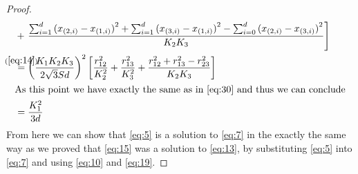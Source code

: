 \begin{proof}
\begin{align}
  &+ \left. \frac{ \sum_{i=1}^d {(x_{(2,i)} - x_{(1,i)})}^2 +
    \sum_{i=1}^d {(x_{(3,i)} - x_{(1,i)})}^2 -
    \sum_{i=0}^d {(x_{(2,i)} - x_{(3,i)})}^2}{K_2 K_3} \right] \\
  &\stackrel{\mathclap{(\ref{eq:14})}}{=}
    {\left( \frac{K_1 K_2 K_3}{2 \sqrt{3} S d} \right)}^2
    \left[ \frac{r_{12}^2}{K_2^2} + \frac{r_{13}^2}{K_3^2} +
    \frac{r_{12}^2 + r_{13}^2 - r_{23}^2}{K_2 K_3} \right] \\
  \intertext{As this point we have exactly the same as in \cref{eq:30} and thus
  we can conclude}
  &= \frac{K_1^2}{3 d}
\end{align}
%
From here we can show that \cref{eq:5} is a solution to \cref{eq:7} in the
exactly the same way as
we proved that \cref{eq:15} was a solution to \cref{eq:13}, by substituting
\cref{eq:5} into \cref{eq:7} and using \cref{eq:10} and \cref{eq:19}.
\end{proof}

